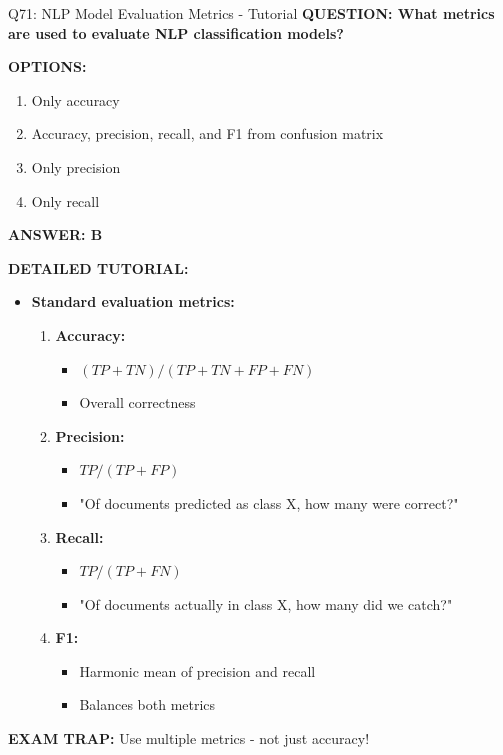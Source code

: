 \documentclass[8pt]{beamer}
\begin{document}
	
	\begin{frame}{Q71: NLP Model Evaluation Metrics - Tutorial}
		\fontsize{6.5}{7.5}\selectfont
		\textbf{QUESTION: What metrics are used to evaluate NLP classification models?}
		
		\vspace{0.1cm}
		\textbf{OPTIONS:}
		\begin{enumerate}
			\item Only accuracy
			\item Accuracy, precision, recall, and F1 from confusion matrix
			\item Only precision
			\item Only recall
		\end{enumerate}
		
		\vspace{0.1cm}
		\textcolor{myblue}{\textbf{ANSWER: B}}
		
		\vspace{0.1cm}
		\textbf{DETAILED TUTORIAL:}
		\begin{itemize}
			\item \textbf{Standard evaluation metrics:}
			\begin{enumerate}
				\item \textbf{Accuracy:}
				\begin{itemize}
					\item $(TP + TN) / (TP + TN + FP + FN)$
					\item Overall correctness
				\end{itemize}
				\item \textbf{Precision:}
				\begin{itemize}
					\item $TP / (TP + FP)$
					\item "Of documents predicted as class X, how many were correct?"
				\end{itemize}
				\item \textbf{Recall:}
				\begin{itemize}
					\item $TP / (TP + FN)$
					\item "Of documents actually in class X, how many did we catch?"
				\end{itemize}
				\item \textbf{F1:}
				\begin{itemize}
					\item Harmonic mean of precision and recall
					\item Balances both metrics
				\end{itemize}
			\end{enumerate}
		\end{itemize}
		
		\textcolor{myred}{\textbf{EXAM TRAP:}} Use \textcolor{myblue}{multiple metrics} - not just accuracy!
	\end{frame}
	
\end{document}
